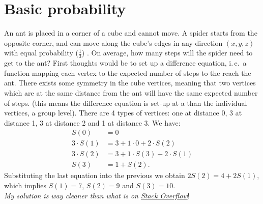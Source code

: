\section{Basic probability}

\begin{qanda}
    \Q An ant is placed in a corner of a cube and cannot move. A spider starts from the opposite corner, and can move along the cube's edges in any direction $(x,y,z)$ with equal probability ($\frac{1}{3}$) . On average, how many steps will the spider need to get to the ant?
    \A 
    First thoughts would be to set up a difference equation, i.\,e.\ a function mapping each vertex to the expected number of steps to the reach the ant.
    There exists some symmetry in the cube vertices, meaning that two vertices which are at the same distance from the ant will have the same expected number of steps. 
    (this means the difference equation is set-up at a  than the individual vertices, a group level).
    There are 4 types of vertices: one at distance 0, 3 at distance 1, 3 at distance 2 and 1 at distance 3. We have:
    \begin{align*}
        S(0) &= 0 \\
        3 \cdot S(1) &= 3 + 1 \cdot 0 + 2 \cdot S(2) \\
        3 \cdot S(2) &= 3 + 1 \cdot S(3) + 2 \cdot  S(1) \\
        S(3) &= 1 + S(2).
    \end{align*}
    Substituting the last equation into the previous we obtain $2 S(2) = 4 + 2 S(1)$, which implies $S(1) = 7$, $S(2) = 9$ and $S(3) = 10$. \\
    \emph{My solution is way cleaner than what is on \href{https://stats.stackexchange.com/questions/139384/random-walk-on-the-edges-of-a-cube}{Stack Overflow}}!
\end{qanda}

